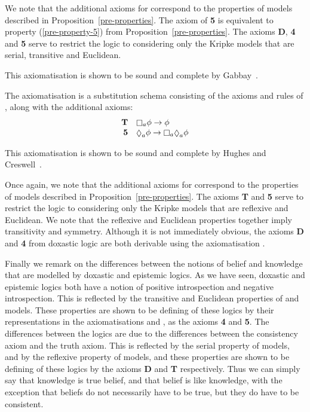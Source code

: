 We note that the additional axioms for \axiomKD{} correspond to the properties
of \classKD{} models described in Proposition~\ref{pre-properties}. The axiom of
{\bf 5} is equivalent to property (\ref{pre-property-5}) from
Proposition~\ref{pre-properties}. The axioms {\bf D}, {\bf 4} and {\bf 5} serve
to restrict the logic to considering only the Kripke models that are serial,
transitive and Euclidean.

This axiomatisation is shown to be sound and complete by
Gabbay~\cite{gabbay2003many}.

\begin{definition}
The axiomatisation \axiomS{} is a substitution schema consisting of the axioms
and rules of \axiomK{}, along with the additional axioms:
$$
\begin{array}{rl}
{\bf T} & \knows_a \phi \implies \phi\\
{\bf 5} & \suspects_a \phi \implies \knows_a \suspects_a \phi\\
\end{array}
$$
\end{definition}

This axiomatisation is shown to be sound and complete by Hughes and
Creswell~\cite{hughes1996new}.

Once again, we note that the additional axioms for \axiomS{} correspond to the
properties of \classS{} models described in Proposition~\ref{pre-properties}.
The axioms {\bf T} and {\bf 5} serve to restrict the logic to considering only
the Kripke models that are reflexive and Euclidean.  We note that the reflexive
and Euclidean properties together imply transitivity and symmetry. Although it
is not immediately obvious, the axioms {\bf D} and {\bf 4} from doxastic logic
are both derivable using the axiomatisation \axiomS{}.

Finally we remark on the differences between the notions of belief and knowledge
that are modelled by doxastic and epistemic logics. As we have seen, doxastic
and epistemic logics both have a notion of positive introspection and negative
introspection. This is reflected by the transitive and Euclidean properties of
\classKD{} and \classS{} models. These properties are shown to be defining of
these logics by their representations in the axiomatisations \axiomKD{} and
\axiomS{}, as the axioms {\bf 4} and {\bf 5}. The differences between the logics
are due to the differences between the consistency axiom and the truth axiom.
This is reflected by the serial property of \classKD{} models, and by the
reflexive property of \classS{} models, and these properties are shown to be
defining of these logics by the axioms {\bf D} and {\bf T} respectively. Thus we
can simply say that knowledge is true belief, and that belief is like knowledge,
with the exception that beliefs do not necessarily have to be true, but they do
have to be consistent.
